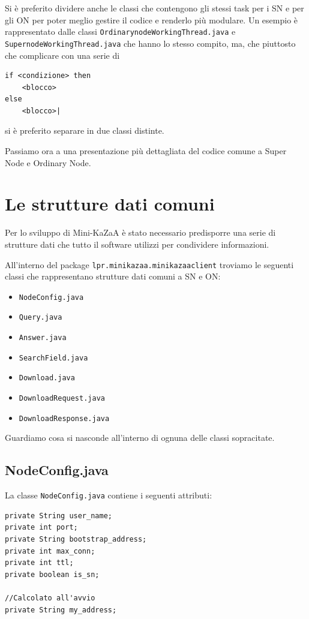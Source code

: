 Si è preferito dividere anche le classi che contengono gli stessi task per i SN e per gli ON per poter meglio gestire il codice e renderlo più modulare.
Un esempio è rappresentato dalle classi \verb|OrdinarynodeWorkingThread.java| e \verb|SupernodeWorkingThread.java| che hanno lo stesso compito, ma, che piuttosto che complicare con una serie di 
\begin{verbatim}
if <condizione> then 
	<blocco> 
else 
	<blocco>|
\end{verbatim}
si è preferito separare in due classi distinte.

Passiamo ora a una presentazione più dettagliata del codice comune a Super Node e Ordinary Node.

\section{Le strutture dati comuni}
Per lo sviluppo di Mini-KaZaA è stato necessario predisporre una serie di strutture dati che tutto il software
utilizzi per condividere informazioni.

All'interno del package \verb|lpr.minikazaa.minikazaaclient| troviamo le seguenti classi che rappresentano strutture dati comuni a SN e ON:
\begin{itemize}
 \item \verb|NodeConfig.java|
 \item \verb|Query.java|
 \item \verb|Answer.java|
 \item \verb|SearchField.java|
 \item \verb|Download.java|
 \item \verb|DownloadRequest.java|
 \item \verb|DownloadResponse.java|
\end{itemize}

Guardiamo cosa si nasconde all'interno di ognuna delle classi sopracitate.

\subsection{NodeConfig.java}
La classe \verb|NodeConfig.java| contiene i seguenti attributi:
\newline
\begin{lstlisting}
private String user_name;
private int port;
private String bootstrap_address;
private int max_conn;
private int ttl;
private boolean is_sn;

//Calcolato all'avvio
private String my_address;
\end{lstlisting}


